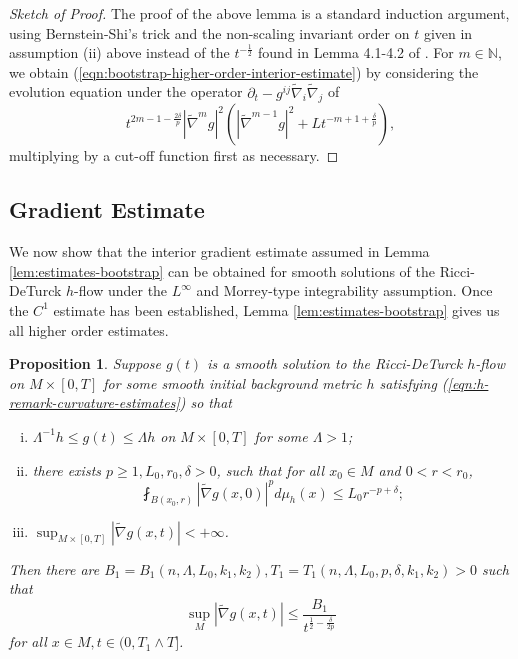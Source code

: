 \documentclass[12pt]{amsart}
\theoremstyle{plain}
\theoremstyle{plain}
\newtheorem{proposition}[subsection]{Proposition}
\theoremstyle{definition}
\theoremstyle{remark}
\numberwithin{equation}{subsection}
\newcommand{\hdel}{\tilde{\nabla}}
\begin{document}
\begin{proof}[Sketch of Proof]
    The proof of the above lemma is a standard induction argument, using Bernstein-Shi's trick and the non-scaling invariant order on $t$ given in assumption (ii) above instead of the $t^{-\frac{1}{2}}$ found in Lemma 4.1-4.2 of \cite{simon_deformation_2002}. For $m \in \mathbb{N}$, we obtain (\ref{eqn:bootstrap-higher-order-interior-estimate}) by considering the evolution equation under the operator $\partial_t - g^{ij}\hdel_i\hdel_j$ of 
    \begin{equation*}
        t^{2m-1-\frac{2\delta}{p}}|\hdel^m g|^2\left(|\hdel^{m-1}g|^2 + Lt^{-m+1+\frac{\delta}{p}}\right),
    \end{equation*}
    multiplying by a cut-off function first as necessary.
\end{proof}

\subsection{Gradient Estimate}

We now show that the interior gradient estimate assumed in Lemma \ref{lem:estimates-bootstrap} can be obtained for smooth solutions of the Ricci-DeTurck $h$-flow under the $L^\infty$ and Morrey-type integrability assumption. Once the $C^1$ estimate has been established, Lemma \ref{lem:estimates-bootstrap} gives us all higher order estimates.

\begin{proposition}\label{prop:gradient-estimate}
    Suppose $g(t)$ is a smooth solution to the Ricci-DeTurck $h$-flow on $M \times [0,T]$ for some smooth initial background metric $h$ satisfying (\ref{eqn:h-remark-curvature-estimates}) so that
    \begin{enumerate}[(i)]
        \item $\Lambda^{-1}h \leq g(t) \leq \Lambda h$ on $M\times[0,T]$ for some $\Lambda > 1$;
        \item there exists $p \geq 1, L_0, r_0 ,\delta > 0$,  such that for all $x_0 \in M$ and $0 < r < r_0$,
        \begin{equation*}
            \fint_{B(x_0,r)} |\hdel g(x,0)|^p d\mu_h(x) \leq L_0r^{-p+\delta};
        \end{equation*}
        \item $\sup_{M\times [0,T]} |\tilde\nabla g(x,t)|<+\infty$.
    \end{enumerate}
    Then there are $B_1 = B_1(n,\Lambda,L_0,k_1,k_2), T_1 = T_1(n,\Lambda,L_0,p,\delta,k_1,k_2) > 0$ such that
    \begin{equation}\label{eqn:interior-gradient-estimate}
        \sup\limits_M|\hdel g(x,t)| \leq \frac{B_1}{t^{\frac{1}{2}-\frac{\delta}{2p}}}
    \end{equation}
    for all $x \in M, t \in (0, T_1\wedge T]$.
\end{proposition}
\end{document}
